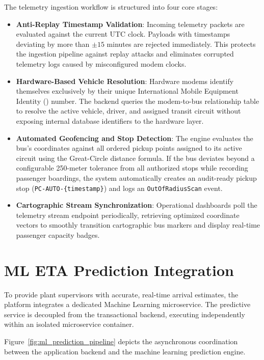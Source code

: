 The telemetry ingestion workflow is structured into four core stages:
\begin{itemize}
  \item \textbf{Anti-Replay Timestamp Validation}: Incoming telemetry packets are evaluated against the current UTC clock. Payloads with timestamps deviating by more than $\pm 15$ minutes are rejected immediately. This protects the ingestion pipeline against replay attacks and eliminates corrupted telemetry logs caused by misconfigured modem clocks.
  \item \textbf{Hardware-Based Vehicle Resolution}: Hardware modems identify themselves exclusively by their unique International Mobile Equipment Identity () number. The backend queries the modem-to-bus relationship table to resolve the active vehicle, driver, and assigned transit circuit without exposing internal database identifiers to the hardware layer.
  \item \textbf{Automated Geofencing and Stop Detection}: The engine evaluates the bus's coordinates against all ordered pickup points assigned to its active circuit using the Great-Circle  distance formula. If the bus deviates beyond a configurable 250-meter tolerance from all authorized stops while recording passenger boardings, the system automatically creates an audit-ready pickup stop (\texttt{PC-AUTO-\{timestamp\}}) and logs an \texttt{OutOfRadiusScan} event.
  \item \textbf{Cartographic Stream Synchronization}: Operational dashboards poll the telemetry stream endpoint periodically, retrieving optimized coordinate vectors to smoothly transition cartographic bus markers and display real-time passenger capacity badges.
\end{itemize}

\section{ML ETA Prediction Integration}
\label{sec:ml_integration}

To provide plant supervisors with accurate, real-time arrival estimates, the platform integrates a dedicated Machine Learning microservice. The predictive service is decoupled from the transactional backend, executing independently within an isolated microservice container.

Figure~\ref{fig:ml_prediction_pipeline} depicts the asynchronous coordination between the application backend and the machine learning prediction engine.

